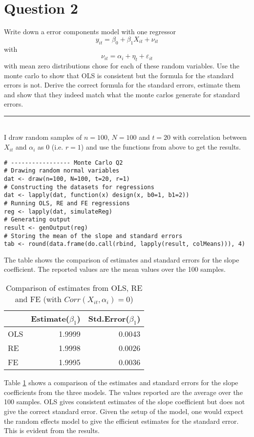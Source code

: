 \documentclass{article}
\newcommand{\floatintro}[1]{
  
  \vspace*{0.1in}
  
  {\footnotesize

    #1
    
  }
  
  \vspace*{0.1in} } \newcommand{\myrule}{\noindent\rule{16cm}{0.5pt}}
\begin{document}
\section*{Question 2}
Write down a error components model with one regressor
\begin{equation}
  \label{eq:1}
  y_{it} = \beta_0 + \beta_1 X_{it} + \nu_{it}
\end{equation}
with
\begin{equation}
  \label{eq:2}
  \nu_{it} = \alpha_i + \eta_t + \varepsilon_{it}
\end{equation}
with mean zero distributions chose for each of these random
variables. Use the monte carlo to show that OLS is consistent but the
formula for the standard errors is not. Derive the correct formula for
the standard errors, estimate them and show that they indeed match
what the monte carlos generate for standard errors.\\ \myrule\\
I draw random samples of $n=100$, $N=100$ and $t=20$ with correlation
between $X_{it}$ and $\alpha_i$ as 0 (i.e. $r=1$) and use the
functions from above to get the results.
\begin{verbatim}
# ----------------- Monte Carlo Q2
# Drawing random normal variables
dat <- draw(n=100, N=100, t=20, r=1)
# Constructing the datasets for regressions
dat <- lapply(dat, function(x) design(x, b0=1, b1=2))
# Running OLS, RE and FE regressions
reg <- lapply(dat, simulateReg)
# Generating output
result <- genOutput(reg)
# Storing the mean of the slope and standard errors
tab <- round(data.frame(do.call(rbind, lapply(result, colMeans))), 4)
\end{verbatim}
\begin{table}[htbp]
  \floatintro{The table shows the comparison of estimates and standard
    errors for the slope coefficient. The reported values are the mean
    values over the 100 samples.}
  \centering
  \begin{tabular}{lrr}
    \hline
    & Estimate($\beta_1$) & Std.Error($\beta_1$) \\ 
    \hline
    OLS & 1.9999 & 0.0043 \\ 
    RE & 1.9998 & 0.0026 \\ 
    FE & 1.9995 & 0.0036 \\ 
    \hline
  \end{tabular}
  \caption{Comparison of estimates from OLS, RE and FE (with
    $Corr(X_{it}, \alpha_i)=0$)}
  \label{tab:q2}
\end{table}
Table \ref{tab:q2} shows a comparison of the estimates and standard
errors for the slope coefficients from the three models. The values
reported are the average over the 100 samples. OLS gives consistent
estimates of the slope coefficient but does not give the correct
standard error. Given the setup of the model, one would expect the
random effects model to give the efficient estimates for the standard
error. This is evident from the results.
\end{document}
